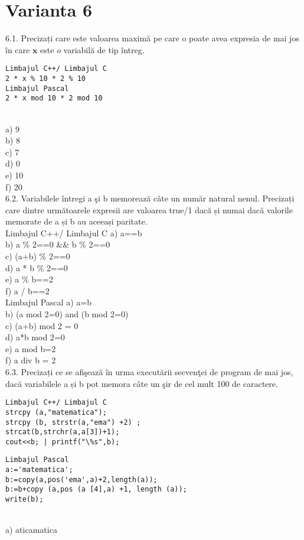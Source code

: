 \section*{Varianta 6}

6.1. Precizați care este valoarea maximă pe care o poate avea expresia de mai jos în care $\mathbf{x}$ este $o$ variabilă de tip întreg.
\begin{verbatim}
Limbajul C++/ Limbajul C
2 * x % 10 * 2 % 10
Limbajul Pascal
2 * x mod 10 * 2 mod 10
\end{verbatim}
\\
a) 9
\\
b) 8
\\
c) 7
\\
d) 0
\\
e) 10
\\
f) 20
\\
6.2. Variabilele întregi a şi b memorează câte un număr natural nenul. Precizați care dintre următoarele expresii are valoarea true/1 dacă și numai dacă valorile memorate de a și b au aceeași paritate.
\\
Limbajul C++/ Limbajul C
a) a==b
\\
b) a \% 2==0 \&\& b \% 2==0
\\
c) (a+b) \% 2==0
\\
d) a * b \% 2==0
\\
e) a \% b==2
\\
f) a / b==2
\\
Limbajul Pascal
a) a=b
\\
b) (a mod 2=0) and (b mod 2=0)
\\ 
c) (a+b) mod 2 = 0
\\
d) a*b mod 2=0
\\
e) a mod b=2
\\
f) a div b = 2
\\
6.3. Precizați ce se afişează în urma executării secvenţei de program de mai jos, dacă variabilele a și b pot memora câte un şir de cel mult 100 de caractere.
\begin{verbatim}
Limbajul C++/ Limbajul C
strcpy (a,"matematica");
strcpy (b, strstr(a,"ema") +2) ;
strcat(b,strchr(a,a[3])+1);
cout<<b; | printf("\%s",b);
\end{verbatim}
\begin{verbatim}
Limbajul Pascal
a:='matematica';
b:=copy(a,pos('ema',a)+2,length(a));
b:=b+copy (a,pos (a [4],a) +1, length (a));
write(b);
\end{verbatim}
\\
a) aticamatica
\\
